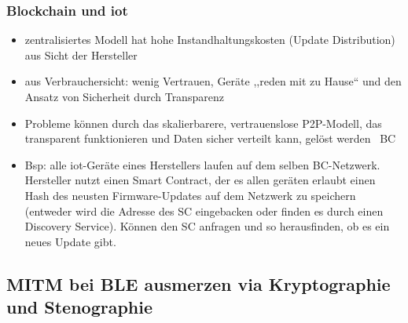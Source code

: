     \subsubsection*{Blockchain und \gls{iot}}
        \begin{itemize}
            \item zentralisiertes Modell hat hohe Instandhaltungskosten (Update Distribution) aus Sicht der Hersteller
            \item aus Verbrauchersicht: wenig Vertrauen, Geräte ,,reden mit zu Hause`` und den Ansatz von Sicherheit durch Transparenz
            \item Probleme können durch das skalierbarere, vertrauenslose P2P-Modell, das transparent funktionieren und Daten sicher verteilt kann, gelöst werden \textrightarrow\ BC
            \item Bsp: alle \gls{iot}-Geräte eines Herstellers laufen auf dem selben BC-Netzwerk. Hersteller nutzt einen Smart Contract, der es allen geräten erlaubt einen Hash des neusten Firmware-Updates auf dem Netzwerk zu speichern (entweder wird die Adresse des SC eingebacken oder finden es durch einen Discovery Service). Können den SC anfragen und so herausfinden, ob es ein neues Update gibt.
        \end{itemize}

\subsection{MITM bei BLE ausmerzen via Kryptographie und Stenographie}\cite{Bapat2017}
